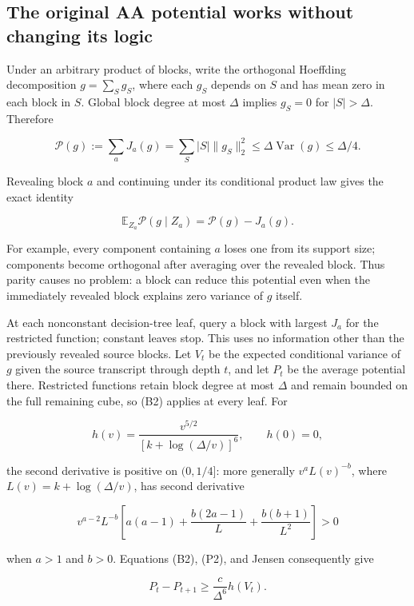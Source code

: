 \subsection{The original AA potential works without changing its
logic}\label{influence-recovery:the-original-aa-potential-works-without-changing-its-logic}

Under an arbitrary product of blocks, write the orthogonal Hoeffding
decomposition \(g=\sum_Sg_S\), where each \(g_S\) depends on \(S\) and
has mean zero in each block in \(S\). Global block degree at most
\(\Delta\) implies \(g_S=0\) for \(|S|>\Delta\). Therefore

\[
 \mathcal P(g):=\sum_a J_a(g)
 =\sum_S |S|\|g_S\|_2^2
 \le\Delta\operatorname{Var}(g)\le\Delta/4.
 \tag{P1}
\]

Revealing block \(a\) and continuing under its conditional product law
gives the exact identity

\[
 \mathbb E_{Z_a}\mathcal P(g\mid Z_a)
 =\mathcal P(g)-J_a(g).
 \tag{P2}
\]

For example, every component containing \(a\) loses one from its support
size; components become orthogonal after averaging over the revealed
block. Thus parity causes no problem: a block can reduce this potential
even when the immediately revealed block explains zero variance of \(g\)
itself.

At each nonconstant decision-tree leaf, query a block with largest
\(J_a\) for the restricted function; constant leaves stop. This uses no
information other than the previously revealed source blocks. Let
\(V_t\) be the expected conditional variance of \(g\) given the source
transcript through depth \(t\), and let \(P_t\) be the average potential
there. Restricted functions retain block degree at most \(\Delta\) and
remain bounded on the full remaining cube, so (B2) applies at every
leaf. For

\[
 h(v)=\frac{v^{5/2}}{[k+\log(\Delta/v)]^6},\qquad h(0)=0,
\]

the second derivative is positive on \((0,1/4]\): more generally
\(v^aL(v)^{-b}\), where \(L(v)=k+\log(\Delta/v)\), has second derivative

\[
 v^{a-2}L^{-b}\left[a(a-1)
       +\frac{b(2a-1)}L+\frac{b(b+1)}{L^2}\right]>0
\]

when \(a>1\) and \(b>0\). Equations (B2), (P2), and Jensen consequently
give

\[
 P_t-P_{t+1}\ge\frac c{\Delta^6}h(V_t).
 \tag{P3}
\]

